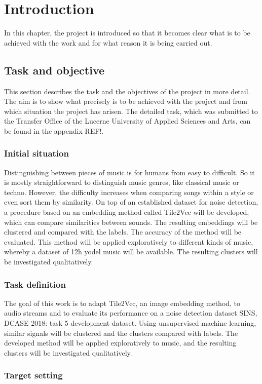 \chapter{Introduction}
\label{ch:Introduction}

In this chapter, the project is introduced so that it becomes clear what is to be achieved with the work and for what reason it is being carried out.

\section{Task and objective}
\label{sec:Task-Objective}

This section describes the task and the objectives of the project in more detail. The aim is to show what precisely is to be achieved with the project and from which situation the project has arisen. The detailed task, which was submitted to the Transfer Office of the Lucerne University of Applied Sciences and Arts, can be found in the appendix REF!.

\subsection{Initial situation}
\label{sub:Initial-Stituation}

Distinguishing between pieces of music is for humans from easy to difficult. So it is mostly straightforward to distinguish music genres, like classical music or techno. However, the difficulty increases when comparing songs within a style or even sort them by similarity.
\newline
\newline
On top of an established dataset for noise detection, a procedure based on an embedding method called Tile2Vec will be developed, which can compare similarities between sounds. The resulting embeddings will be clustered and compared with the labels. The accuracy of the method will be evaluated.
\newline
\newline
This method will be applied exploratively to different kinds of music, whereby a dataset of 12h yodel music will be available. The resulting clusters will be investigated qualitatively. 

\subsection{Task definition}
\label{sub:Task-Definition}

The goal of this work is to adapt Tile2Vec, an image embedding method, to audio streams and to evaluate its performance on a noise detection dataset \flqq SINS, DCASE 2018: task 5 development dataset\frqq. Using unsupervised machine learning, similar signals will be clustered and the clusters compared with labels. The developed method will be applied exploratively to music, and the resulting clusters will be investigated qualitatively.

\subsection{Target setting}
\label{sub:Target-Setting}